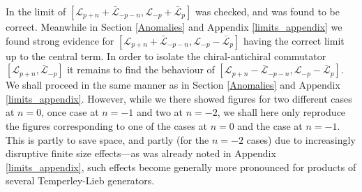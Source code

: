 \documentclass[a4paper,10pt]{article}
\newcommand{\linnea}[1]{$\framebox{\tiny L}$\ \textbf{\texttt{{\color{red}\footnotesize#1}}}}
\newcommand{\KSgen}{\mathcal{L}}
\begin{document}
In \cite{KooSaleur} the limit of $[\KSgen_{p+n}+\bar{\KSgen}_{-p-n},\KSgen_{-p}+\bar{\KSgen}_{p}]$ was checked, and was found to be correct. Meanwhile in Section \ref{Anomalies} and Appendix \ref{limits_appendix} we found strong evidence for $[\KSgen_{p+n}  +\bar{\KSgen}_{-p-n},\KSgen_{-p}-\bar{\KSgen}_{p}]$ having the correct limit up to the central term. In order to isolate the chiral-antichiral commutator $[\KSgen_{p+n},\bar{\KSgen}_{-p}]$
it remains to find the behaviour of $[\KSgen_{p+n}-\bar{\KSgen}_{-p-n},\KSgen_{-p}-\bar{\KSgen}_{p}]$.
We shall proceed in the same manner as in Section \ref{Anomalies} and Appendix \ref{limits_appendix}. However, while we there showed figures for two different cases at $n=0$, once case at $n=-1$ and two at $n=-2$, we shall here only reproduce the figures corresponding to one of the cases at $n=0$ and the case at $n=-1$. This is partly to save space, and partly (for the $n=-2$ cases) due to increasingly disruptive finite size effects---as was already noted in Appendix \ref{limits_appendix}, such effects become generally more pronounced for products of several Temperley-Lieb generators. 



\end{document}
